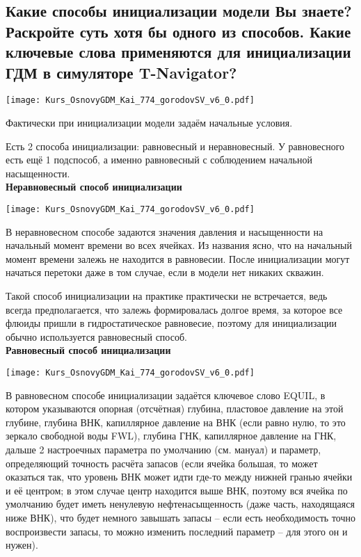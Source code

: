 

\subsection{Какие способы инициализации модели Вы знаете? Раскройте суть хотя бы одного из способов. Какие ключевые слова применяются для инициализации ГДМ в симуляторе T-Navigator?}

\texttt{[image: Kurs\_OsnovyGDM\_Kai\_774\_gorodovSV\_v6\_0.pdf]}

Фактически при инициализации модели задаём начальные условия.

Есть 2 способа инициализации: равновесный и неравновесный.
У равновесного есть ещё 1 подспособ, а именно равновесный с соблюдением начальной насыщенности.  
\\

\textbf{Неравновесный способ инициализации}

\texttt{[image: Kurs\_OsnovyGDM\_Kai\_774\_gorodovSV\_v6\_0.pdf]}

В неравновесном способе задаются значения давления и насыщенности на начальный момент времени во всех ячейках.
Из названия ясно, что на начальный момент времени залежь не находится в равновесии.
После инициализации могут начаться перетоки даже в том случае, если в модели нет никаких скважин.

Такой способ инициализации на практике практически не встречается, ведь всегда предполагается, что залежь формировалась долгое время, за которое все флюиды пришли в гидростатическое равновесие, поэтому для инициализации обычно используется равновесный способ.
\\

\textbf{Равновесный способ инициализации}

\texttt{[image: Kurs\_OsnovyGDM\_Kai\_774\_gorodovSV\_v6\_0.pdf]}

В равновесном способе инициализации задаётся ключевое слово EQUIL, в котором указываются опорная (отсчётная) глубина, пластовое давление на этой глубине, глубина ВНК, капиллярное давление на ВНК (если равно нулю, то это зеркало свободной воды FWL), глубина ГНК, капиллярное давление на ГНК, дальше 2 настроечных параметра по умолчанию (см. мануал) и параметр, определяющий точность расчёта запасов (если ячейка большая, то может оказаться так, что уровень ВНК может идти где-то между нижней гранью ячейки и её центром; в этом случае центр находится выше ВНК, поэтому вся ячейка по умолчанию будет иметь ненулевую нефтенасыщенность (даже часть, находящаяся ниже ВНК), что будет немного завышать запасы -- если есть необходимость точно воспроизвести запасы, то можно изменить последний параметр -- для этого он и нужен).
\\

